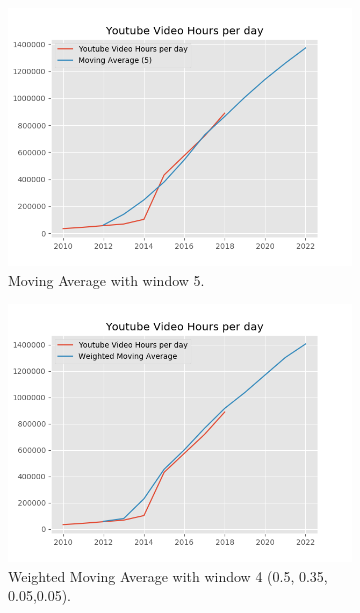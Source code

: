 \begin{figure}[t]
\begin{subfigure}[t]{0.30\linewidth}
\includegraphics[width=\linewidth ]{fig/yt_ma.png}
\caption{{\footnotesize Moving Average with window 5.}}\vspace{-2mm}
\label{fig:pla1}
\end{subfigure}
\begin{subfigure}[t]{0.30\linewidth}
\includegraphics[width=\linewidth ]{fig/yt_wma.png}
\caption{{\footnotesize Weighted Moving Average with window 4 (0.5, 0.35, 0.05,0.05).}}\vspace{-2mm}
\label{fig:pla2}
\end{subfigure}
\begin{subfigure}[t]{0.30\linewidth}

\end{subfigure}
\end{figure}
